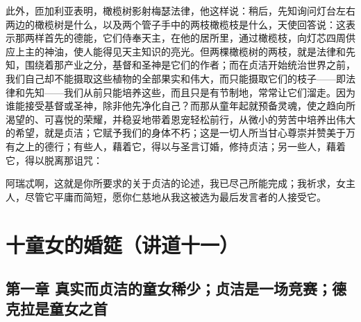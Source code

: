 此外，匝加利亚表明，橄榄树影射梅瑟法律，他这样说：稍后，先知询问灯台左右两边的橄榄树是什么，以及两个管子手中的两枝橄榄枝是什么，天使回答说：这表示那两样首先的德能，它们侍奉天主，在他的居所里，通过橄榄枝，向灯芯四周供应上主的神油，使人能得见天主知识的亮光。但两棵橄榄树的两枝，就是法律和先知，围绕着那产业之分，基督和圣神是它们的作者；而在贞洁开始统治世界之前，我们自己却不能摄取这些植物的全部果实和伟大，而只能摄取它们的枝子——即法律和先知——我们从前只能培养这些，而且只是有节制地，常常让它们溜走。因为谁能接受基督或圣神，除非他先净化自己？而那从童年起就预备灵魂，使之趋向所渴望的、可喜悦的荣耀，并稳妥地带着恩宠轻松前行，从微小的劳苦中培养出伟大的希望，就是贞洁；它赋予我们的身体不朽；这是一切人所当甘心尊崇并赞美于万有之上的德行；有些人，藉着它，得以与圣言订婚，修持贞洁；另一些人，藉着它，得以脱离那诅咒：\par

阿瑞忒啊，这就是你所要求的关于贞洁的论述，我已尽己所能完成；我祈求，女主人，尽管它平庸而简短，愿你仁慈地从我这被选为最后发言者的人接受它。\par



\section{十童女的婚筵（讲道十一）}

\par


\subsection{第一章  真实而贞洁的童女稀少；贞洁是一场竞赛；德克拉是童女之首}


